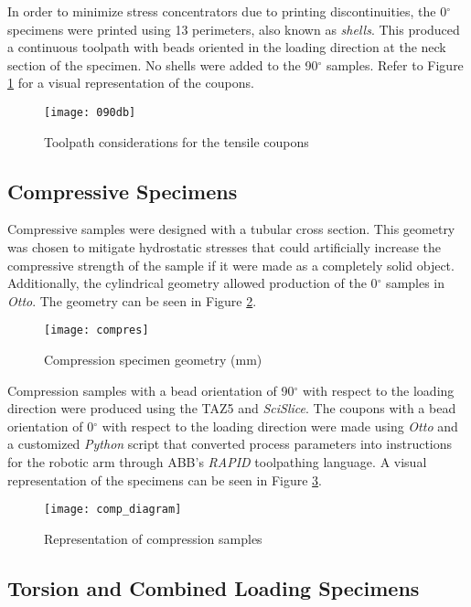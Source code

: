 \documentclass[main.tex]{subfiles}
\begin{document}
In order to minimize stress concentrators due to printing discontinuities, the 0$^\circ$ specimens were printed using 13 perimeters, also known as \emph {shells}. This produced a continuous toolpath with beads oriented in the loading direction at the neck section of the specimen. No shells were added to the 90$^\circ$ samples. Refer to Figure \ref{fig:090db} for a visual representation of the coupons. 

\begin{figure}[h]
	\center
	\texttt{[image: 090db]}
	\caption{Toolpath considerations for the tensile coupons} \label{fig:090db}
\end{figure}

\subsection{Compressive Specimens}

Compressive samples were designed with a tubular cross section. This geometry was chosen to mitigate hydrostatic stresses that could artificially increase the compressive strength of the sample if it were made as a completely solid object. Additionally, the cylindrical geometry allowed production of the 0$^\circ$ samples in \emph{Otto}. The geometry can be seen in Figure \ref{fig:comp}.
\begin{figure}[h]
	\center
	\texttt{[image: compres]}
	\caption{Compression specimen geometry (mm)} \label{fig:comp}
\end{figure}

Compression samples with a bead orientation of 90$^\circ$ with respect to the loading direction were produced using the TAZ5 and \emph{SciSlice}. The coupons with a bead orientation of 0$^\circ$ with respect to the loading direction were made using \emph{Otto} and a customized \emph{Python} script that converted process parameters into instructions for the robotic arm through ABB's \emph{RAPID} toolpathing language. A visual representation of the specimens can be seen in Figure \ref{fig:comp_d}. 
\begin{figure}[h]
	\center
	\texttt{[image: comp\_diagram]}
	\caption{Representation of compression samples} \label{fig:comp_d}
\end{figure}

\subsection{Torsion and Combined Loading Specimens}
\end{document}

